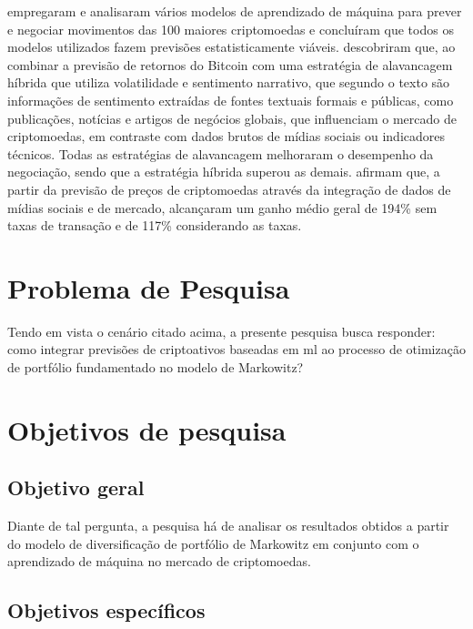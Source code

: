  empregaram e analisaram vários modelos de aprendizado de máquina para prever e negociar movimentos das 100 maiores criptomoedas e concluíram que todos os modelos utilizados fazem previsões estatisticamente viáveis.  descobriram que, ao combinar a previsão de retornos do Bitcoin com uma estratégia de alavancagem híbrida que utiliza volatilidade e sentimento narrativo, que segundo o texto são informações de sentimento extraídas de fontes textuais formais e públicas, como publicações, notícias e artigos de negócios globais, que influenciam o mercado de criptomoedas, em contraste com dados brutos de mídias sociais ou indicadores técnicos. Todas as estratégias de alavancagem melhoraram o desempenho da negociação, sendo que a estratégia híbrida superou as demais.  afirmam que, a partir da previsão de preços de criptomoedas através da integração de dados de mídias sociais e de mercado, alcançaram um ganho médio geral de 194\% sem taxas de transação e de 117\% considerando as taxas.

\section{Problema de Pesquisa}

\label{sec_problema_de_pesquisa}

Tendo em vista o cenário citado acima, a presente pesquisa busca responder: como integrar previsões de criptoativos baseadas em \acl{ml} ao processo de otimização de portfólio fundamentado no modelo de Markowitz?

\section{Objetivos de pesquisa}

\label{sec_objetivos_de_pesquisa}

\subsection{Objetivo geral}

\label{subsec_objetivo_geral}

Diante de tal pergunta, a pesquisa há de analisar os resultados obtidos a partir do modelo de diversificação de portfólio de Markowitz em conjunto com o aprendizado de máquina no mercado de criptomoedas.

\subsection{Objetivos específicos}

